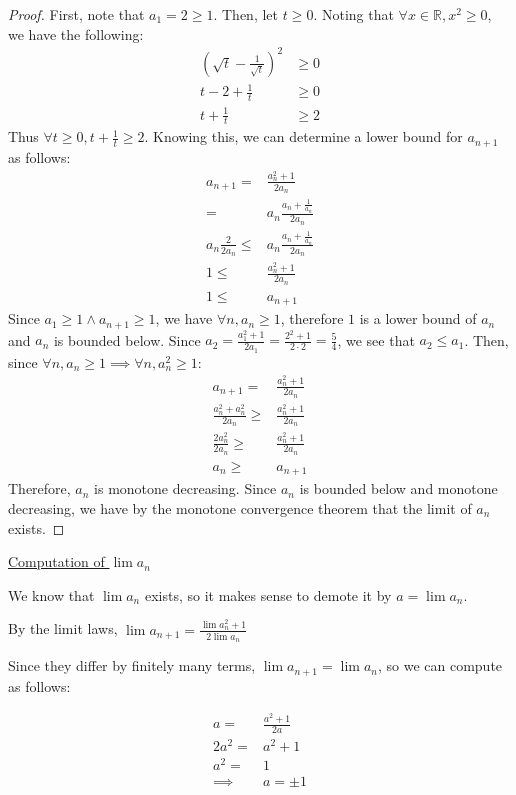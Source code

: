 \documentclass{article}
\newcommand{\reals}{\ensuremath{\mathbb{R}}}
\begin{document}
\begin{proof}
	First, note that $a_1 = 2 \geq 1$.
	Then, let $t \geq 0$. Noting that $\forall x \in \reals, x^2 \geq 0$, we have the following:
	\begin{align}
		(\sqrt{t} - \frac{1}{\sqrt{t}})^2 & \geq 0 \\
		t - 2 + \frac{1}{t} & \geq 0 \\
		t + \frac{1}{t} & \geq 2
	\end{align}
	Thus $\forall t \geq 0, t + \frac{1}{t} \geq 2$.
	Knowing this, we can determine a lower bound for $a_{n+1}$ as follows:
	\begin{align}
		a_{n+1} = & \frac{a_n^2 + 1}{2a_n} \\
		= & a_n \frac{a_n + \frac{1}{a_n}}{2a_n} \\
		a_n\frac{2}{2a_n} \le & a_n \frac{a_n + \frac{1}{a_n}}{2a_n} \\
		1 \le & \frac{a_n^2 + 1}{2a_n} \\
		1 \le & a_{n+1}
	\end{align}
	Since $a_1 \geq 1 \land a_{n+1} \geq 1$,
	we have $\forall n, a_n \geq 1$,
	therefore $1$ is a lower bound of $a_n$
	and $a_n$ is bounded below.
	Since $a_2 = \frac{a_1^2 + 1}{2a_1} = \frac{2^2 + 1}{2 \cdot 2} = \frac{5}{4}$,
	we see that $a_2 \le a_1$.
	Then, since $\forall n, a_n \geq 1 \implies \forall n, a_n^2 \geq 1$:
	\begin{align}
		a_{n+1} = & \frac{a_n^2 + 1}{2a_n} \\
		\frac{a_n^2 + a_n^2}{2a_n} \geq & \frac{a_n^2+1}{2a_n} \\
		\frac{2a_n^2}{2a_n} \geq & \frac{a_n^2+1}{2a_n} \\
		a_n \geq & a_{n+1}
	\end{align}
	Therefore, $a_n$ is monotone decreasing.
	Since $a_n$ is bounded below and monotone decreasing,
	we have by the monotone convergence theorem that
	the limit of $a_n$ exists.
\end{proof}

\underline{Computation of $\lim a_n$}

We know that $\lim a_n$ exists, so it makes sense to demote it by $a = \lim a_n$.

By the limit laws, $\lim a_{n+1} = \frac{\lim a_n^2 + 1}{2\lim{a_n}}$

Since they differ by finitely many terms, $\lim a_{n+1} = \lim a_n$,
so we can compute as follows:

\begin{align}
	a = & \frac{a^2 + 1}{2a} \\
	2a^2 = & a^2 + 1 \\
	a^2 = & 1 \\
	\implies & a = \pm 1
\end{align}
\end{document}
